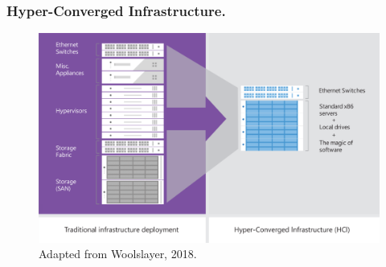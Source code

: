 \documentclass[aspectratio=169]{beamer}
\begin{document}
\begin{frame}
\frametitle{Hyper-Converged Infrastructure.}  
\vspace{0.5cm}
    \begin{figure}
        \includegraphics[height=.8\textheight]{../bachproef/img/StandVanZaken/HCI.png}
        \caption{Adapted from Woolslayer, 2018.}
    \end{figure}
\end{frame}
\end{document}
